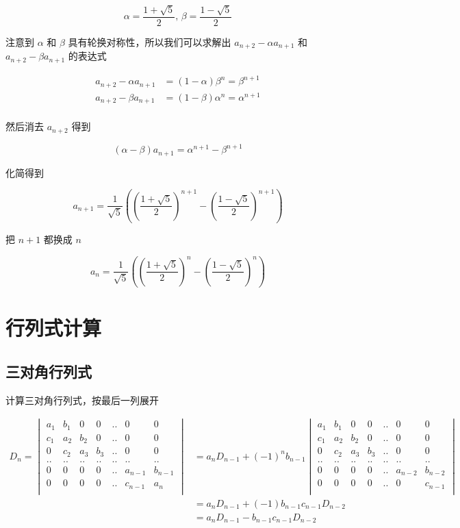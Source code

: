 \documentclass[12pt,a4paper]{ctexart}
\begin{document}
\[
\alpha = \frac{1+\sqrt{5}}{2},\, \beta = \frac{1-\sqrt{5}}{2}
\]

注意到 $\alpha$ 和 $\beta$ 具有轮换对称性，所以我们可以求解出 $a_{n+2} - \alpha a_{n+1}$ 和  $a_{n+2} - \beta a_{n+1}$ 的表达式

\begin{align*}
 a_{n+2} - \alpha a_{n+1} &= (1-\alpha) \beta^{n} = \beta^{n+1}  \\
 a_{n+2} - \beta a_{n+1} &= (1-\beta) \alpha^{n} = \alpha^{n+1}  \\
\end{align*}

然后消去 $a_{n+2}$ 得到

\[
(\alpha - \beta)a_{n+1} = \alpha^{n+1} -  \beta^{n+1}
\]

化简得到

\[
a_{n+1} = \frac{1}{\sqrt{5}}((\frac{1+\sqrt{5}}{2})^{n+1} - (\frac{1-\sqrt{5}}{2})^{n+1})
\]

把 $n+1$ 都换成 $n$

\[
a_{n} = \frac{1}{\sqrt{5}}((\frac{1+\sqrt{5}}{2})^{n} - (\frac{1-\sqrt{5}}{2})^{n})
\]

\section{行列式计算}

\subsection{三对角行列式}

计算三对角行列式，按最后一列展开

\begin{align*}
    D_n = \begin{vmatrix}
        a_1 & b_1 & 0 & 0 & .. & 0 & 0 \\
        c_1 & a_2 & b_2 & 0 & .. & 0 & 0 \\
        0 & c_2 & a_3 & b_3 & .. & 0 & 0 \\
        .. & .. & .. & .. & .. & .. & .. \\
        0 & 0 & 0 & 0 & ..& a_{n-1} & b_{n-1} \\
        0 & 0 & 0 & 0 & .. & c_{n-1} & a_n \\
    \end{vmatrix} &= a_nD_{n-1} + (-1)^nb_{n-1} \begin{vmatrix}
        a_1 & b_1 & 0 & 0 & .. & 0 & 0 \\
        c_1 & a_2 & b_2 & 0 & .. & 0 & 0 \\
        0 & c_2 & a_3 & b_3 & .. & 0 & 0 \\
        .. & .. & .. & .. & .. & .. & .. \\
        0 & 0 & 0 & 0 & ..& a_{n-2} & b_{n-2} \\
        0 & 0 & 0 & 0 & .. & 0 & c_{n-1} \\
    \end{vmatrix}  \\
    &= a_nD_{n-1} + (-1)b_{n-1}c_{n-1}D_{n-2} \\
    &= a_nD_{n-1} - b_{n-1}c_{n-1}D_{n-2}
\end{align*}
\end{document}
